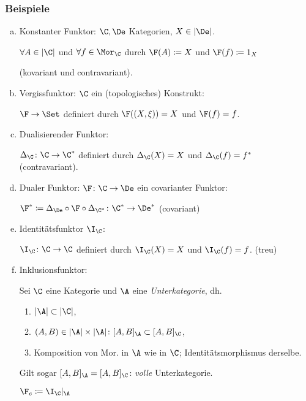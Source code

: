 \begin{frame}
  \frametitle{Beispiele}
  \begin{enumerate}[a)]
      \item<+-> Konstanter Funktor:
      $\C,\De$ Kategorien, $X \in |\De|$.

        $\forall A \in |\C|$ und $\forall f \in \Mor_\C$ durch $\F(A) \coloneqq X$ und $\F(f) \coloneqq 1_X$ 
        
        (kovariant und contravariant).
      \item<+-> Vergissfunktor: $\C$ ein (topologisches) Konstrukt: 
        
        $\F \to \Set$ definiert durch $\F((X, \xi)) = X$ und $\F(f) = f$.
      \item<+-> Dualisierender Funktor: 
        
        $\Delta_\C \colon \C \to \C^*$ definiert durch $\Delta_\C(X) = X$ und $\Delta_\C(f) = f^*$ (contravariant).
      \item<+-> Dualer Funktor: $\F \colon \C \to \De$ ein covarianter Funktor:
        
        $\F^* \coloneqq \Delta_{\De} \circ \F \circ \Delta_{\C^*} \colon \C^* \to \De^*$ (covariant)
        
      \item<+-> Identitätsfunktor $\I_\C$: 
        
        $\I_\C \colon \C \to \C$ definiert durch $\I_\C(X) = X$ und $\I_\C(f) = f$. (treu)

      \item<+-> Inklusionsfunktor: 
        
        Sei $\C$ eine Kategorie und $\A$ eine \emph{Unterkategorie}, dh.
        \begin{enumerate}[1.]
          \item $|\A| \subset |\C|$,
          \item $(A, B) \in |\A| \times |\A| \colon [A, B]_\A \subset [A,B]_\C$,
          \item Komposition von Mor. in $\A$ wie in $\C$; Identitätsmorphismus derselbe.
        \end{enumerate}
        Gilt sogar $[A, B]_\A = [A, B]_\C$: \emph{volle} Unterkategorie.

        $\F_e \coloneqq \I_\C |_\A$
    \end{enumerate}
\end{frame}

